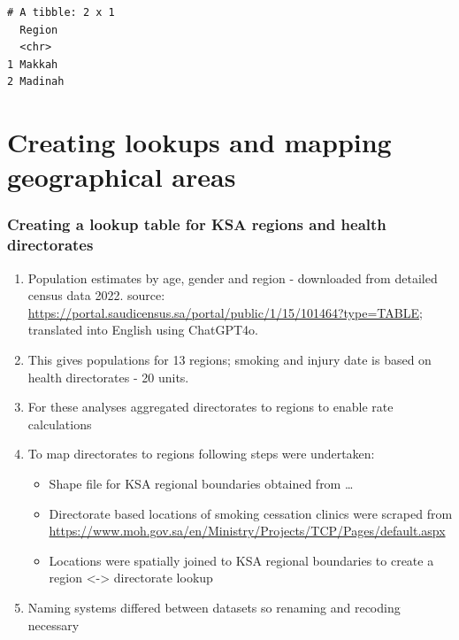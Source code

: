 \documentclass[
  letterpaper,
  DIV=11,
  numbers=noendperiod]{scrreprt}
\begin{document}
\begin{verbatim}
# A tibble: 2 x 1
  Region 
  <chr>  
1 Makkah 
2 Madinah
\end{verbatim}


\chapter{Creating lookups and mapping geographical
areas}\label{creating-lookups-and-mapping-geographical-areas}

\subsection{Creating a lookup table for KSA regions and health
directorates}\label{creating-a-lookup-table-for-ksa-regions-and-health-directorates}

\begin{enumerate}
\def\labelenumi{\arabic{enumi}.}
\item
  Population estimates by age, gender and region - downloaded from
  detailed census data 2022. source:
  \url{https://portal.saudicensus.sa/portal/public/1/15/101464?type=TABLE;}
  translated into English using ChatGPT4o.
\item
  This gives populations for 13 regions; smoking and injury date is
  based on health directorates - 20 units.
\item
  For these analyses aggregated directorates to regions to enable rate
  calculations
\item
  To map directorates to regions following steps were undertaken:

  \begin{itemize}
  \item
    Shape file for KSA regional boundaries obtained from \ldots{}
  \item
    Directorate based locations of smoking cessation clinics were
    scraped from
    \url{https://www.moh.gov.sa/en/Ministry/Projects/TCP/Pages/default.aspx}
  \item
    Locations were spatially joined to KSA regional boundaries to create
    a region \textless-\textgreater{} directorate lookup
  \end{itemize}
\item
  Naming systems differed between datasets so renaming and recoding
  necessary
\end{enumerate}
\end{document}
